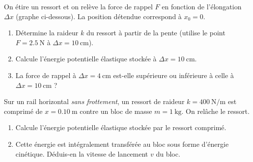 \documentclass[11pt,a4paper]{article}
\begin{document}
\begin{exo}
On étire un ressort et on relève la force de rappel $F$ en fonction de l'élongation $\Delta x$
(graphe ci-dessous). La position détendue correspond à $x_0=0$.
\begin{center}
\end{center}
\begin{enumerate}[label=\alph*)]
  \item Détermine la raideur $k$ du ressort à partir de la pente (utilise le point
        $F=\qty{2,5}{\newton}$ à $\Delta x=\qty{10}{\centi\metre}$).
  \item Calcule l'énergie potentielle élastique stockée à $\Delta x=\qty{10}{\centi\metre}$.
  \item La force de rappel à $\Delta x=\qty{4}{\centi\metre}$ est-elle supérieure ou inférieure à
        celle à $\Delta x=\qty{10}{\centi\metre}$ ?
\end{enumerate}
\end{exo}

\begin{exo}
Sur un rail horizontal \emph{sans frottement}, un ressort de raideur $k=\qty{400}{\newton\per\metre}$ est
comprimé de $x=\qty{0,10}{\metre}$ contre un bloc de masse $m=\qty{1}{\kilogram}$. On relâche le ressort.
\begin{enumerate}[label=\alph*)]
  \item Calcule l'énergie potentielle élastique stockée par le ressort comprimé.
  \item Cette énergie est intégralement transférée au bloc sous forme d'énergie cinétique. Déduis-en la
        vitesse de lancement $v$ du bloc.
\end{enumerate}
\end{exo}
\end{document}
